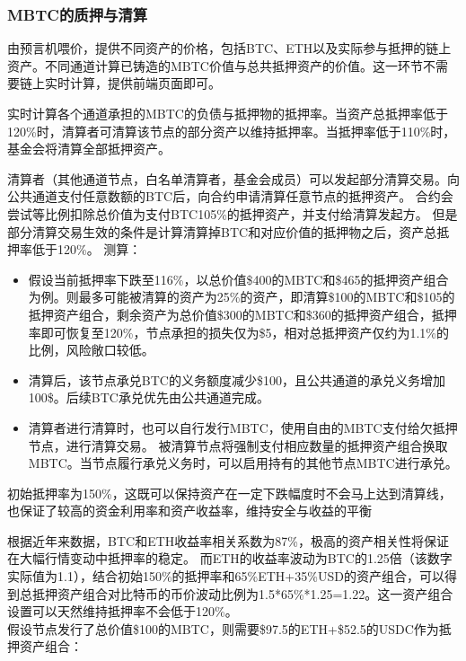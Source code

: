 \documentclass{article}
\begin{document}
\subsubsection{MBTC的质押与清算}
\par 由预言机喂价，提供不同资产的价格，包括BTC、ETH以及实际参与抵押的链上资产。不同通道计算已铸造的MBTC价值与总共抵押资产的价值。这一环节不需要链上实时计算，提供前端页面即可。
\par 实时计算各个通道承担的MBTC的负债与抵押物的抵押率。当资产总抵押率低于120\%时，清算者可清算该节点的部分资产以维持抵押率。当抵押率低于110\%时，基金会将清算全部抵押资产。
\par 清算者（其他通道节点，白名单清算者，基金会成员）可以发起部分清算交易。向公共通道支付任意数额的BTC后，向合约申请清算任意节点的抵押资产。 合约会尝试等比例扣除总价值为支付BTC105\%的抵押资产，并支付给清算发起方。 但是部分清算交易生效的条件是计算清算掉BTC和对应价值的抵押物之后，资产总抵押率低于120\%\cite{aavev3}。 
测算：
\begin{itemize}
    \item 假设当前抵押率下跌至116\%，以总价值\$400的MBTC和\$465的抵押资产组合为例。则最多可能被清算的资产为25\%的资产，即清算\$100的MBTC和\$105的抵押资产组合，剩余资产为总价值\$300的MBTC和\$360的抵押资产组合，抵押率即可恢复至120\%，节点承担的损失仅为\$5，相对总抵押资产仅约为1.1\%的比例，风险敞口较低。
    \item 清算后，该节点承兑BTC的义务额度减少\$100，且公共通道的承兑义务增加100\$。后续BTC承兑优先由公共通道完成。
    \item 清算者进行清算时，也可以自行发行MBTC，使用自由的MBTC支付给欠抵押节点，进行清算交易。 被清算节点将强制支付相应数量的抵押资产组合换取MBTC。当节点履行承兑义务时，可以启用持有的其他节点MBTC进行承兑。
\end{itemize}
\par 初始抵押率为150\%，这既可以保持资产在一定下跌幅度时不会马上达到清算线，也保证了较高的资金利用率和资产收益率，维持安全与收益的平衡
\par 根据近年来数据，BTC和ETH收益率相关系数为87\%，极高的资产相关性将保证在大幅行情变动中抵押率的稳定。 而ETH的收益率波动为BTC的1.25倍（该数字实际值为1.1），结合初始150\%的抵押率和65\%ETH+35\%USD的资产组合，可以得到总抵押资产组合对比特币的币价波动比例为1.5*65\%*1.25=1.22。这一资产组合设置可以天然维持抵押率不会低于120\%。\\
假设节点发行了总价值\$100的MBTC，则需要\$97.5的ETH+\$52.5的USDC作为抵押资产组合：
\end{document}
